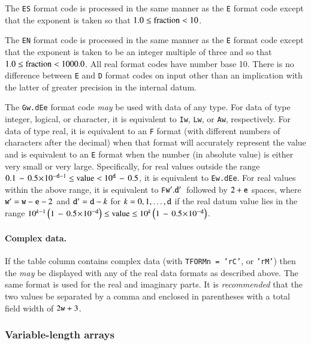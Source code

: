 \documentclass[onecolumn]{aa}
\begin{document}
 The {\tt ES} format code is processed in
 the same manner as the {\tt E} format code except that the exponent is
 taken so that $ 1.0 \leq {\rm fraction} < 10$.  
 
 The {\tt EN} format code is
 processed in the same manner as the {\tt E} format code except that
 the exponent is taken to be an integer multiple of three and so that 
 $ 1.0\leq {\rm fraction} < 1000.0$.   All real format codes have number base
 10. There is no difference between {\tt E} and {\tt D} format codes
 on input other than an implication with the latter of 
 greater precision in the internal datum.
 
 The {\tt G}{\tt w.d\/}{\tt E}{\tt e\/} format code {\em may} be used with
 data of any type.  For data of type integer, logical, or character, it
 is equivalent to {\tt I}{\tt w}, {\tt L}{\tt w}, or 
 {\tt A}{\tt w}, respectively.  For data of type real, it is
 equivalent to an {\tt F} format (with different numbers of characters
 after the decimal) when that format will accurately represent the value
 and is equivalent to an {\tt E} format when the number (in absolute
 value) is either very small or very large.  Specifically, for real
 values outside the range 
 $0.1\,-\,0.5\!\times\! 10^{-{\tt d}-1} \leq {\rm value} < 10^{\tt d}\,-\,0.5$,
 it is
 equivalent to {\tt E}{\tt w.d}{\tt E}{\tt e}. For real values
 within the above range, it is equivalent to 
 {\tt F}{${\tt w}^{\prime}.{\tt d}^{\prime}\,$} followed by 
 $2 + {\tt e}$ spaces, where
 ${\tt w}^{\prime} = {\tt w} - {\tt e} - 2$ and ${\tt d}^{\prime} = 
 {\tt d} - k$ for 
 $k = 0,1,\ldots,{\tt d}$ if the real datum value lies in the range $10^{k-1}
 \left(1\,-\, 0.5\!\times\!10^{-{\tt d}}\right) \leq {\rm value} \le  10^k
 \left(1\,-\, 0.5\!\times\!10^{-{\tt d}}\right)$.

 \paragraph{Complex data.}  If the table column contains complex data
  (with {\tt TFORMn = 'rC'}, or {\tt 'rM'})
 then the {\em may} be displayed with any of the real data formats as described
 above.  The same format is used for the real and imaginary parts.
 It is {\em recommended} that the two values be separated by a comma and enclosed 
 in parentheses with a total field width of $2{\tt w} + 3$.

\subsubsection{Variable-length arrays}
\label{s:app_varlen}
\end{document}
